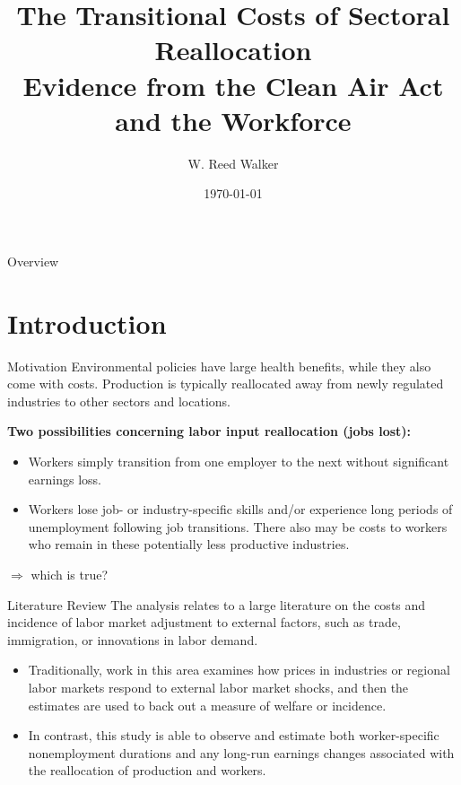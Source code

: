 \documentclass{beamer}
\title[Q. J. Econ, 2013]{The Transitional Costs of Sectoral Reallocation \\ {\small Evidence from the Clean Air Act and the Workforce}}
\author{W. Reed Walker}
\institute[]{Presenter: Qinzhu Sun}
\date{\today}
\begin{document}
\begin{frame}
	\titlepage
\end{frame}

\begin{frame}{Overview}
	\tableofcontents
\end{frame}
\section{Introduction}
\begin{frame}[shrink]
	\transfade %
	\tableofcontents[sectionstyle=show/shaded,subsectionstyle=show/shaded/hide]
	\addtocounter{framenumber}{-1}
\end{frame}
\begin{frame}{Motivation}
	Environmental policies have large health benefits, while they also come with costs. Production is typically reallocated away from newly regulated industries to other sectors and locations.
	\medskip

	\textbf{Two possibilities concerning labor input reallocation (jobs lost):}
	\begin{itemize}
		\item Workers simply transition from one employer to the next without significant earnings loss.
		\item Workers lose job- or industry-specific skills and/or experience long periods of unemployment following job transitions. There also may be costs to workers who remain in these potentially less productive industries.
	\end{itemize}
	$\Rightarrow$ which is true?
\end{frame}
\begin{frame}{Literature Review}
	The analysis relates to a large literature on the costs and incidence of labor market adjustment to external factors, such as trade, immigration, or innovations in labor demand.
	\medskip

	\begin{itemize}
		\item Traditionally, work in this area examines how prices in industries or regional labor markets respond to external labor market shocks, and then the estimates are used to back out a measure of welfare or incidence.
		\item In contrast, this study is able to observe and estimate both worker-specific nonemployment durations and any long-run earnings changes associated with the reallocation of production and workers.
	\end{itemize}
\end{frame}
\end{document}
